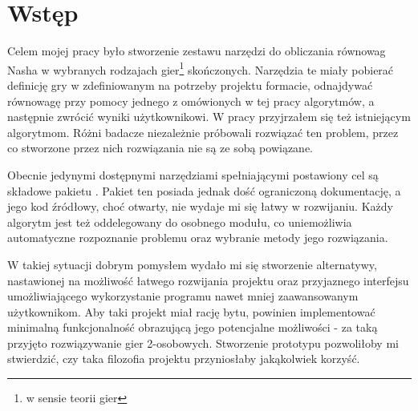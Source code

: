 \documentclass[polish]{standalone}
\begin{document}
\pagestyle{headings}

\section*{Wstęp}

Celem mojej pracy było stworzenie zestawu narzędzi do obliczania równowag Nasha w wybranych rodzajach gier\footnote{w
sensie teorii gier} skończonych. Narzędzia te miały pobierać definicję gry w zdefiniowanym na potrzeby projektu
formacie, odnajdywać równowagę przy pomocy jednego z omówionych w tej pracy algorytmów, a następnie zwrócić wyniki
użytkownikowi. W pracy przyjrzałem się też istniejącym algorytmom. Różni badacze niezależnie próbowali rozwiązać ten
problem, przez co stworzone przez nich rozwiązania nie są ze sobą powiązane.

Obecnie jedynymi dostępnymi narzędziami spełniającymi postawiony cel są składowe pakietu . Pakiet ten
posiada jednak dość ograniczoną dokumentację, a jego kod źródłowy, choć otwarty, nie wydaje mi się łatwy w rozwijaniu.
Każdy algorytm jest też oddelegowany do osobnego modułu, co uniemożliwia automatyczne rozpoznanie problemu oraz
wybranie metody jego rozwiązania.

W takiej sytuacji dobrym pomysłem wydało mi się stworzenie alternatywy, nastawionej na możliwość łatwego rozwijania
projektu oraz przyjaznego interfejsu umożliwiającego wykorzystanie programu nawet mniej zaawansowanym użytkownikom. Aby
taki projekt miał rację bytu, powinien implementować minimalną funkcjonalność obrazującą jego potencjalne możliwości
- za taką przyjęto rozwiązywanie gier 2-osobowych. Stworzenie prototypu pozwoliłoby mi stwierdzić, czy taka filozofia
projektu przyniosłaby jakąkolwiek korzyść.
\end{document}
